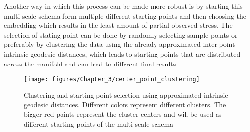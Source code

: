	Another way in which this process can be made more robust is by starting this multi-scale schema form multiple different starting points and then choosing the embedding which results in the least amount of partial observed stress. The selection of stating point can be done by randomly selecting sample points or preferably by clustering the data using the already approximated inter-point intrinsic geodesic distances, which leads to starting points that are distributed across the manifold and can lead to different final results.
	
	\begin{figure}[h]
		\begin{centering}
			\texttt{[image: figures/Chapter\_3/center\_point\_clustering]}
			\par\end{centering}
		\caption[Clustering and starting point selection]{Clustering and starting point selection using approximated intrinsic
			geodesic distances. Different colors represent different clusters.
			The bigger red points represent the cluster centers and will be used
			as different starting points of the multi-scale schema\label{fig:Clustering-by-geodesic}}
	\end{figure}
